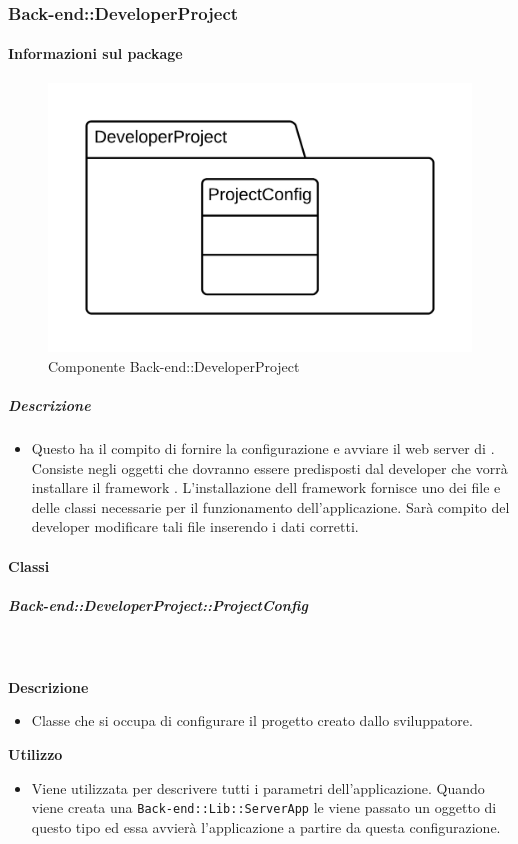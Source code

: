   \subsubsection{Back-end::DeveloperProject}
  \paragraph{Informazioni sul package} 
    \begin{figure}[H] 
      \begin{center} 
        \includegraphics[width=\textwidth]{packages/Back-end::DeveloperProject.png}  
        \caption{Componente Back-end::DeveloperProject}
      \end{center}  
    \end{figure} 
  \subparagraph{Descrizione} 
    \begin{itemize}
    \item[] Questo  ha il compito di fornire la configurazione e avviare il web server di . Consiste negli oggetti che dovranno essere predisposti dal developer che vorrà installare il framework . L'installazione dell framework  fornisce uno  dei file e delle classi necessarie per il funzionamento dell'applicazione. Sarà compito del developer modificare tali file inserendo i dati corretti.
    \end{itemize} 
    \paragraph{Classi}
      \subparagraph{Back-end::DeveloperProject::ProjectConfig}
        
        \textbf{\\ \\ Descrizione} 
          \begin{itemize}
            \item[] Classe che si occupa di configurare il progetto creato dallo sviluppatore.
          \end{itemize}      
        \textbf{Utilizzo}  
          \begin{itemize}
            \item[] Viene utilizzata per descrivere tutti i parametri dell'applicazione. Quando viene creata una \texttt{Back-end::Lib::ServerApp} le viene passato un oggetto di questo tipo ed essa avvierà l'applicazione a partire da questa configurazione.
          \end{itemize}
